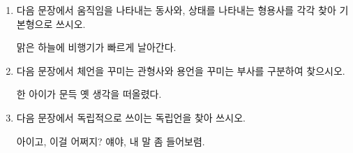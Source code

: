 \documentclass[fs9,seriesRus]{korfarm-base}
\begin{document}
\begin{enumerate}[leftmargin=22pt, itemsep=6pt, topsep=4pt, label=\textbf{\arabic*.}]
\item 다음 문장에서 움직임을 나타내는 동사와, 상태를 나타내는 형용사를 각각 찾아 기본형으로 쓰시오.
\begin{kfEvidence}맑은 하늘에 비행기가 빠르게 날아간다.\end{kfEvidence}
\item 다음 문장에서 체언을 꾸미는 관형사와 용언을 꾸미는 부사를 구분하여 찾으시오.
\begin{kfEvidence}한 아이가 문득 옛 생각을 떠올렸다.\end{kfEvidence}
\item 다음 문장에서 독립적으로 쓰이는 독립언을 찾아 쓰시오.
\begin{kfEvidence}아이고, 이걸 어쩌지? 얘야, 내 말 좀 들어보렴.\end{kfEvidence}
\end{enumerate}

\end{document}
